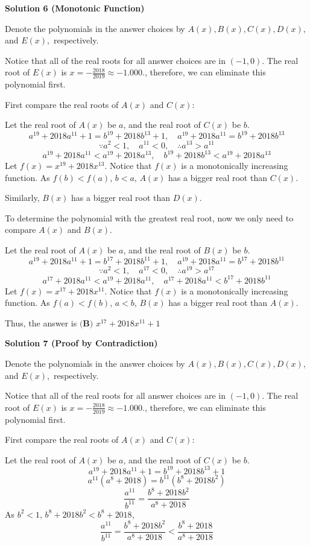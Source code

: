 \begin{enumerate}
\textbf{Solution 6 (Monotonic Function)}

Denote the polynomials in the answer choices by $A(x),B(x),C(x),D(x),$ and $E(x),$ respectively.

 Notice that all of the real roots for all answer choices are in $(-1,0)$. The real root of $E(x)$ is $x=-\frac{2018}{2019}\approx-1.000.$, therefore, we can eliminate this polynomial first.

 First compare the real roots of $A(x)$ and $C(x)$:

 Let the real root of $A(x)$ be $a$, and the real root of $C(x)$ be $b$.
 \[a^{19}+2018a^{11}+1 = b^{19}+2018b^{13}+1, \quad a^{19}+2018a^{11} = b^{19}+2018b^{13}\]
 \[\because a^2 < 1, \quad a^{11} < 0, \quad \therefore a^{13}>a^{11}\]
 \[a^{19}+2018a^{11} < a^{19}+2018a^{13}, \quad b^{19}+2018b^{13} < a^{19}+2018a^{13}\]Let $f(x) = x^{19}+2018x^{13}$. Notice that $f(x)$ is a monotonically increasing function. As $f(b)<f(a)$, $b<a$, $A(x)$ has a bigger real root than $C(x)$.

 Similarly, $B(x)$ has a bigger real root than $D(x)$.

 To determine the polynomial with the greatest real root, now we only need to compare $A(x)$ and $B(x)$.

 Let the real root of $A(x)$ be $a$, and the real root of $B(x)$ be $b$.
 \[a^{19}+2018a^{11}+1 = b^{17}+2018b^{11}+1, \quad a^{19}+2018a^{11} = b^{17}+2018b^{11}\]
 \[\because a^2 < 1, \quad a^{17} < 0, \quad \therefore a^{19}>a^{17}\]
 \[a^{17}+2018a^{11} < a^{19}+2018a^{11}, \quad a^{17}+2018a^{11} < b^{17}+2018b^{11}\]Let $f(x) = x^{17}+2018x^{11}$. Notice that $f(x)$ is a monotonically increasing function. As $f(a)<f(b)$, $a<b$, $B(x)$ has a bigger real root than $A(x)$.

 Thus, the answer is $\boxed{\textbf{(B) }  x^{17}+2018x^{11}+1}$




\textbf{Solution 7 (Proof by Contradiction)}

Denote the polynomials in the answer choices by $A(x),B(x),C(x),D(x),$ and $E(x),$ respectively.

 Notice that all of the real roots for all answer choices are in $(-1,0)$. The real root of $E(x)$ is $x=-\frac{2018}{2019}\approx-1.000.$, therefore, we can eliminate this polynomial first.

 First compare the real roots of $A(x)$ and $C(x)$:

 Let the real root of $A(x)$ be $a$, and the real root of $C(x)$ be $b$.
 \[a^{19}+2018a^{11}+1 = b^{19}+2018b^{13}+1\]
 \[a^{11}(a^8+2018) = b^{11}(b^8+2018b^2)\]
 \[\frac{ a^{11} }{ b^{11} } = \frac{ b^8+2018b^2 }{ a^8+2018 }\]As $b^2<1$, $b^8+2018b^2<b^8+2018$, 
 \[\frac{ a^{11} }{ b^{11} } = \frac{ b^8+2018b^2 }{ a^8+2018 } < \frac{ b^8+2018 }{ a^8+2018 }\]


\end{enumerate}
